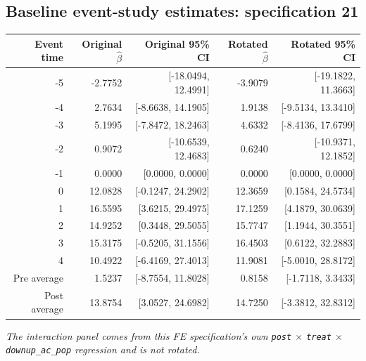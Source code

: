 \documentclass[10pt]{article}
\begin{document}
\subsection*{Baseline event-study estimates: specification 21}
\begin{center}
\scriptsize
\begin{tabular}{r rr rr}
\toprule
Event time & Original $\hat\beta$ & Original 95\% CI & Rotated $\hat\beta$ & Rotated 95\% CI \\
\midrule
-5 & -2.7752 & [-18.0494, 12.4991] & -3.9079 & [-19.1822, 11.3663] \\
-4 & 2.7634 & [-8.6638, 14.1905] & 1.9138 & [-9.5134, 13.3410] \\
-3 & 5.1995 & [-7.8472, 18.2463] & 4.6332 & [-8.4136, 17.6799] \\
-2 & 0.9072 & [-10.6539, 12.4683] & 0.6240 & [-10.9371, 12.1852] \\
-1 & 0.0000 & [0.0000, 0.0000] & 0.0000 & [0.0000, 0.0000] \\
0 & 12.0828 & [-0.1247, 24.2902] & 12.3659 & [0.1584, 24.5734] \\
1 & 16.5595 & [3.6215, 29.4975] & 17.1259 & [4.1879, 30.0639] \\
2 & 14.9252 & [0.3448, 29.5055] & 15.7747 & [1.1944, 30.3551] \\
3 & 15.3175 & [-0.5205, 31.1556] & 16.4503 & [0.6122, 32.2883] \\
4 & 10.4922 & [-6.4169, 27.4013] & 11.9081 & [-5.0010, 28.8172] \\
\midrule
Pre average & 1.5237 & [-8.7554, 11.8028] & 0.8158 & [-1.7118, 3.3433] \\
Post average & 13.8754 & [3.0527, 24.6982] & 14.7250 & [-3.3812, 32.8312] \\
\bottomrule
\end{tabular}
\end{center}
\medskip
\textit{The interaction panel comes from this FE specification's own \texttt{post} $\times$ \texttt{treat} $\times$ \texttt{downup\_ac\_pop} regression and is not rotated.}
\clearpage
\end{document}
